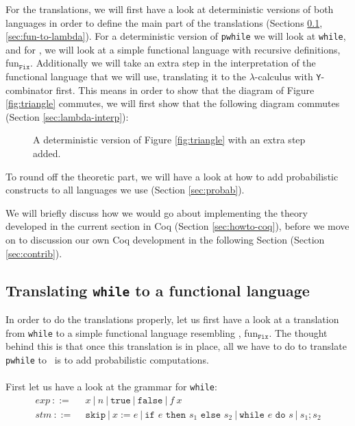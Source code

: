 \documentclass[11pt, leqno, titlepage]{article}
\theoremstyle{definition}
\begin{document}
For the translations, we will first have a look at deterministic versions of both
languages in order to define the main part of the translations (Sections
\ref{sec:while-to-fun}, \ref{sec:fun-to-lambda}). For a deterministic version of
\texttt{pwhile} we will look at \texttt{while}, and for \rml, we will look at a
simple functional language with recursive definitions,
fun$_{\texttt{Fix}}$. Additionally we will take an extra step in the interpretation
of the functional language that we will use, translating it to the $\lambda$-calculus
with \texttt{Y}-combinator first.  This means in order to show that the diagram of
Figure \ref{fig:triangle} commutes, we will first show that the following diagram
commutes (Section \ref{sec:lambda-interp}):

\begin{figure}[h]
  \centering
  \caption{A deterministic version of Figure \ref{fig:triangle} with an extra step
    added. }
  \label{fig:triangle-det}
\end{figure}
  
To round off the theoretic part, we will have a look at how to add probabilistic
constructs to all languages we use (Section \ref{sec:probab}).

We will briefly discuss how we would go about implementing the theory developed in
the current section in Coq (Section \ref{sec:howto-coq}), before we move on to
discussion our own Coq development in the following Section (Section
\ref{sec:contrib}).


\subsection{Translating \texttt{while} to a functional
  language}\label{sec:while-to-fun} 
% 
In order to do the translations properly, let us first have a look at a translation
from \texttt{while} to a simple functional language resembling \rml,
fun$_{\texttt{Fix}}$. The thought behind this is that once this translation is in
place, all we have to do to translate \texttt{pwhile} to \rml\ is to add
probabilistic computations.\\
\\
First let us have a look at the grammar for \texttt{while}: 
\begin{align*}
  exp~  ::=~~ & x ~\vert ~n~ \vert ~\texttt{true} ~\vert~ \texttt{false} ~\vert~ f~x \\
  stm~  ::=~~ & \texttt{skip}~ \vert ~x := e ~
               \vert ~\texttt{if } e \texttt{ then } s_1 \texttt{ else } s_2~
               \vert~ \texttt{while } e \texttt{ do } s ~\vert~ s_1;s_2
\end{align*}
\end{document}

